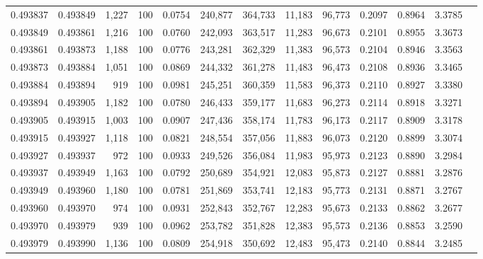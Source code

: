 \begin{tabular}{rrrrrrrrrrrrr}
0.493837 & 0.493849 & 1,227 & 100 &                                     0.0754 & 240,877 & 364,733 &  11,183 &  96,773 & 0.2097 & 0.8964 & 3.3785 \\
0.493849 & 0.493861 & 1,216 & 100 &                                     0.0760 & 242,093 & 363,517 &  11,283 &  96,673 & 0.2101 & 0.8955 & 3.3673 \\
0.493861 & 0.493873 & 1,188 & 100 &                                     0.0776 & 243,281 & 362,329 &  11,383 &  96,573 & 0.2104 & 0.8946 & 3.3563 \\
0.493873 & 0.493884 & 1,051 & 100 &                                     0.0869 & 244,332 & 361,278 &  11,483 &  96,473 & 0.2108 & 0.8936 & 3.3465 \\
0.493884 & 0.493894 &   919 & 100 &                                     0.0981 & 245,251 & 360,359 &  11,583 &  96,373 & 0.2110 & 0.8927 & 3.3380 \\
0.493894 & 0.493905 & 1,182 & 100 &                                     0.0780 & 246,433 & 359,177 &  11,683 &  96,273 & 0.2114 & 0.8918 & 3.3271 \\
0.493905 & 0.493915 & 1,003 & 100 &                                     0.0907 & 247,436 & 358,174 &  11,783 &  96,173 & 0.2117 & 0.8909 & 3.3178 \\
0.493915 & 0.493927 & 1,118 & 100 &                                     0.0821 & 248,554 & 357,056 &  11,883 &  96,073 & 0.2120 & 0.8899 & 3.3074 \\
0.493927 & 0.493937 &   972 & 100 &                                     0.0933 & 249,526 & 356,084 &  11,983 &  95,973 & 0.2123 & 0.8890 & 3.2984 \\
0.493937 & 0.493949 & 1,163 & 100 &                                     0.0792 & 250,689 & 354,921 &  12,083 &  95,873 & 0.2127 & 0.8881 & 3.2876 \\
0.493949 & 0.493960 & 1,180 & 100 &                                     0.0781 & 251,869 & 353,741 &  12,183 &  95,773 & 0.2131 & 0.8871 & 3.2767 \\
0.493960 & 0.493970 &   974 & 100 &                                     0.0931 & 252,843 & 352,767 &  12,283 &  95,673 & 0.2133 & 0.8862 & 3.2677 \\
0.493970 & 0.493979 &   939 & 100 &                                     0.0962 & 253,782 & 351,828 &  12,383 &  95,573 & 0.2136 & 0.8853 & 3.2590 \\
0.493979 & 0.493990 & 1,136 & 100 &                                     0.0809 & 254,918 & 350,692 &  12,483 &  95,473 & 0.2140 & 0.8844 & 3.2485 \\

\end{tabular}
